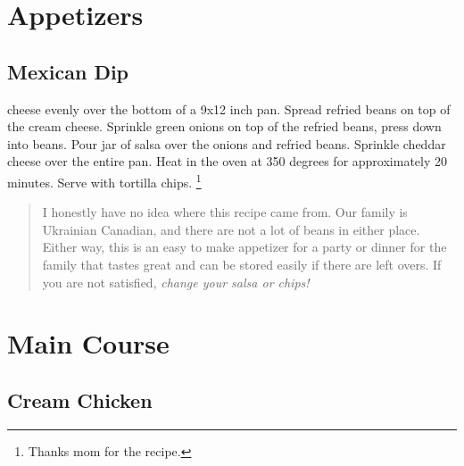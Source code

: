 \documentclass{tufte-book}
\begin{document}
\chapter{Appetizers}

\section{Mexican Dip}

 cheese evenly over the bottom of a 9x12 inch pan. Spread refried beans on top of the cream cheese. Sprinkle green onions on top of the refried beans, press down into beans. Pour jar of salsa over the onions and refried beans. Sprinkle cheddar cheese over the entire pan. Heat in the oven at 350 degrees for approximately 20 minutes. Serve with tortilla chips. \footnote{Thanks mom for the recipe.}

\begin{quote}
I honestly have no idea where this recipe came from. Our family is Ukrainian Canadian, and there are not a lot of beans in either place. Either way, this is an easy to make appetizer for a party or dinner for the family that tastes great and can be stored easily if there are left overs. If you are not satisfied, \emph{change your salsa or chips!}
\end{quote}



\chapter{Main Course}

\section{Cream Chicken}
\end{document}
